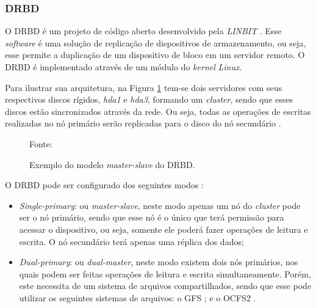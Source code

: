 
\subsubsection{DRBD}
\label{section:drbd}
O \ac{DRBD} é um projeto de código aberto desenvolvido pela \textit{LINBIT} \cite{drbd}.
Esse \textit{software} é uma solução de replicação de dispositivos de armazenamento, ou seja, esse permite a duplicação de um dispositivo de bloco 
em um servidor remoto. O \ac{DRBD} é implementado através de um módulo do \textit{kernel} \textit{Linux}. 

Para ilustrar sua arquitetura, na Figura \ref{fig:drbd_basic} tem-se dois servidores com seus respectivos discos rígidos, \textit{hda1} e 
\textit{hda3}, formando um \textit{cluster}, sendo que esses discos estão sincronizados através da rede. Ou seja, todas as operações de escritas 
realizadas no nó primário serão replicadas para o disco do nó secundário \cite{zaminhani2008}.

\begin{figure}[h!]
 \centering
 \caption{Exemplo do modelo \textit{master-slave} do \ac{DRBD}.}
 Fonte: \citet{jones2010}
 \label{fig:drbd_basic}
\end{figure}

O \ac{DRBD} pode ser configurado dos seguintes modos \cite{drbd}:
\begin{itemize}
 \item \textit{Single-primary}: ou \textit{master-slave}, neste modo apenas um nó do \textit{cluster} pode ser o nó primário, sendo que esse nó 
 é o único que terá permissão para acessar o dispositivo, ou seja, somente ele poderá fazer operações de leitura e escrita. O nó 
 secundário terá apenas uma réplica dos dados;
 \item \textit{Dual-primary}: ou \textit{dual-master}, neste modo existem dois nós primários, nos quais podem ser feitas operações de leitura e 
 escrita simultaneamente. Porém, este necessita de um sistema de arquivos compartilhados, sendo que esse pode utilizar os seguintes sistemas de
 arquivos: o \ac{GFS} \cite{gfs}; e o \ac{OCFS2} \cite{ocfs2}.
\end{itemize}

